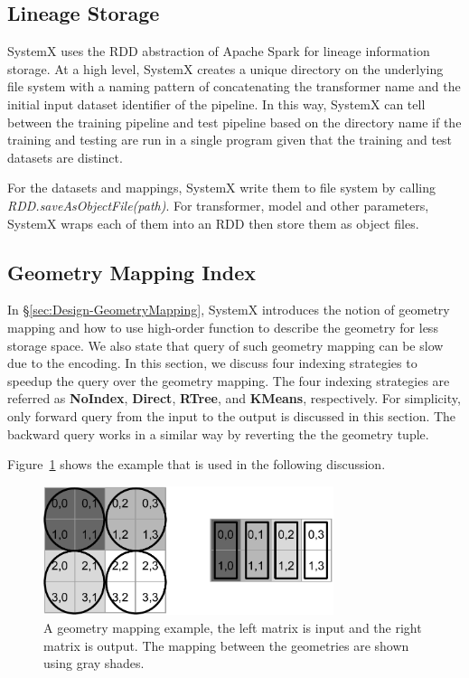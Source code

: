 \documentclass{sig-alternate}
\begin{document}
\subsection{Lineage Storage}
SystemX uses the RDD abstraction of Apache Spark for lineage information storage. 
At a high level, SystemX creates a unique directory on the underlying file system with a naming pattern of 
concatenating the transformer name and the initial input dataset identifier of the pipeline.
In this way, SystemX can tell between the training pipeline and test pipeline based on the directory name
if the training and testing are run in a single program given that the training and test datasets are distinct.

For the datasets and mappings, SystemX write them to file system by calling {\it RDD.saveAsObjectFile(path)}.
For transformer, model and other parameters, SystemX wraps each of them into an RDD then store them as object files.


\subsection{Geometry Mapping Index}
\label{sec:GeometryIndex}
In \S\ref{sec:Design-GeometryMapping}, SystemX introduces the notion of geometry mapping and how to use high-order function
to describe the geometry for less storage space. 
We also state that query of such geometry mapping can be slow due to the encoding. 
In this section, we discuss four indexing strategies to speedup the query over the geometry mapping. 
The four indexing strategies are referred as {\bf NoIndex}, {\bf Direct}, {\bf RTree}, and {\bf KMeans}, respectively.
For simplicity, only forward query from the input to the output is discussed in this section.
The backward query works in a similar way by reverting the the geometry tuple.


Figure~\ref{fig:example} shows the example that is used in the following discussion.
\begin{figure}[t]
\begin{center}
    \includegraphics[width=85mm]{pictures/example}
\caption {A geometry mapping example, the left matrix is input and the right matrix is output. The mapping between the geometries are shown using gray shades.
    \label{fig:example}
}
\end{center}
\end{figure}
\end{document}
